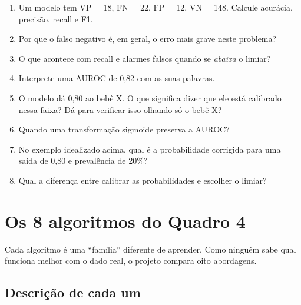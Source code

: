 \documentclass[11pt,a4paper]{article}
\begin{document}
\begin{teste}
\begin{enumerate}
  \item Um modelo tem VP = 18, FN = 22, FP = 12, VN = 148. Calcule acurácia, precisão, recall e F1.
  \item Por que o falso negativo é, em geral, o erro mais grave neste problema?
  \item O que acontece com recall e alarmes falsos quando se \emph{abaixa} o limiar?
  \item Interprete uma AUROC de 0,82 com as suas palavras.
  \item O modelo dá 0,80 ao bebê X. O que significa dizer que ele está calibrado nessa faixa? Dá para verificar isso olhando só o bebê X?
  \item Quando uma transformação sigmoide preserva a AUROC?
  \item No exemplo idealizado acima, qual é a probabilidade corrigida para uma saída de 0,80 e prevalência de 20\%?
  \item Qual a diferença entre calibrar as probabilidades e escolher o limiar?
\end{enumerate}
\end{teste}

\section{Os 8 algoritmos do Quadro 4}

Cada algoritmo é uma ``família'' diferente de aprender. Como ninguém sabe qual funciona melhor com o dado real, o projeto compara oito abordagens.

\subsection{Descrição de cada um}
\end{document}
